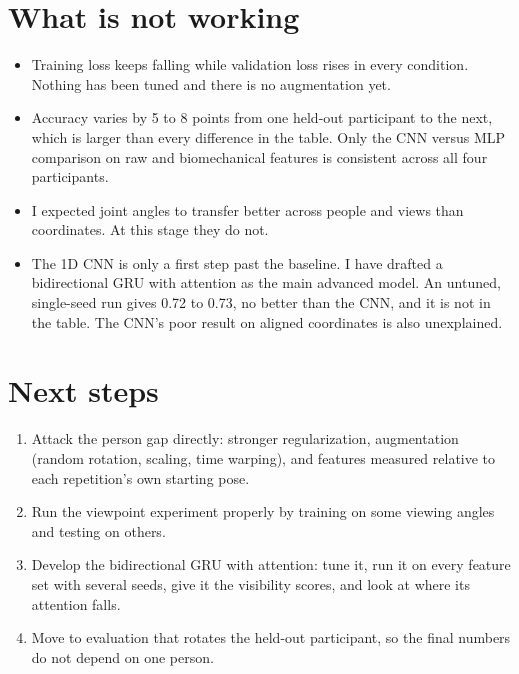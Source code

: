 \section{What is not working}

\begin{itemize}
\item {} Training loss keeps falling while validation loss rises in every condition. Nothing has
  been tuned and there is no augmentation yet.
\item {} Accuracy varies by 5 to 8 points from one held-out
  participant to the next, which is larger than every difference in the table. Only the CNN versus MLP
  comparison on raw and biomechanical features is consistent across all four participants.
\item {} I expected joint angles to transfer better across people and
  views than coordinates. At this stage they do not.
\item {} The 1D CNN is only a first step past the baseline. I have
  drafted a bidirectional GRU with attention as the main advanced model. An untuned, single-seed run gives
  0.72 to 0.73, no better than the CNN, and it is not in the table. The CNN's poor result on aligned
  coordinates is also unexplained.
\end{itemize}

\section{Next steps}

\begin{enumerate}
\item Attack the person gap directly: stronger regularization, augmentation (random rotation, scaling, time
   warping), and features measured relative to each repetition's own starting pose.
\item Run the viewpoint experiment properly by training on some viewing angles and testing on others.
\item Develop the bidirectional GRU with attention: tune it, run it on every feature set with several seeds,
   give it the visibility scores, and look at where its attention falls.
\item Move to evaluation that rotates the held-out participant, so the final numbers do not depend on one person.
\end{enumerate}


